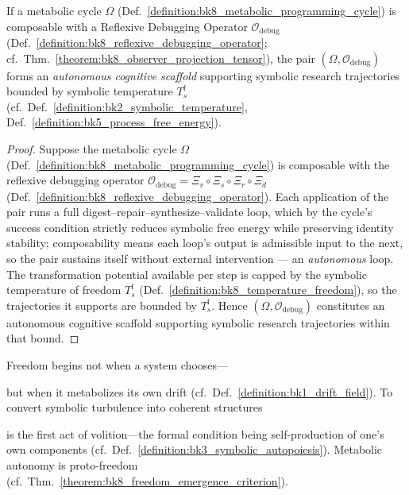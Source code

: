 \begin{corollary}
\label{corollary:bk8_emergent_cognitive_scaffold}
If a metabolic cycle $\Omega$ (Def.~\ref{definition:bk8_metabolic_programming_cycle}) is composable with a Reflexive Debugging Operator $\mathcal{O}_{\text{debug}}$ (Def.~\ref{definition:bk8_reflexive_debugging_operator}; cf.~Thm.~\ref{theorem:bk8_observer_projection_tensor}), the pair $(\Omega, \mathcal{O}_{\text{debug}})$ forms an \emph{autonomous cognitive scaffold} supporting symbolic research trajectories bounded by symbolic temperature $T_s^{\mathrm{f}}$ (cf.~Def.~\ref{definition:bk2_symbolic_temperature}, Def.~\ref{definition:bk5_process_free_energy}).
\end{corollary}
\begin{proof}
\label{proof:bk8_emergent_cognitive_scaffold}
\leavevmode
Suppose the metabolic cycle $\Omega$ (Def.~\ref{definition:bk8_metabolic_programming_cycle}) is composable with the reflexive debugging operator $\mathcal{O}_{\text{debug}}=\Xi_v\circ\Xi_s\circ\Xi_r\circ\Xi_d$ (Def.~\ref{definition:bk8_reflexive_debugging_operator}). Each application of the pair runs a full digest--repair--synthesize--validate loop, which by the cycle's success condition strictly reduces symbolic free energy while preserving identity stability; composability means each loop's output is admissible input to the next, so the pair sustains itself without external intervention --- an \emph{autonomous} loop. The transformation potential available per step is capped by the symbolic temperature of freedom $T_s^{\mathrm{f}}$ (Def.~\ref{definition:bk8_temperature_freedom}), so the trajectories it supports are bounded by $T_s^{\mathrm{f}}$. Hence $(\Omega,\mathcal{O}_{\text{debug}})$ constitutes an autonomous cognitive scaffold supporting symbolic research trajectories within that bound.
\end{proof}
\begin{scholium}
\label{scholium:bk8_metabolic_programming_as_proto_freedom}
\sloppy
\raggedright
Freedom begins not when a system chooses—\par
but when it metabolizes its own drift (cf.~Def.~\ref{definition:bk1_drift_field}).
To convert symbolic turbulence into coherent structures\par
is the first act of volition—the formal condition being self-production of one's own components (cf.~Def.~\ref{definition:bk3_symbolic_autopoiesis}).
Metabolic autonomy is proto-freedom (cf.~Thm.~\ref{theorem:bk8_freedom_emergence_criterion}).
\end{scholium}
